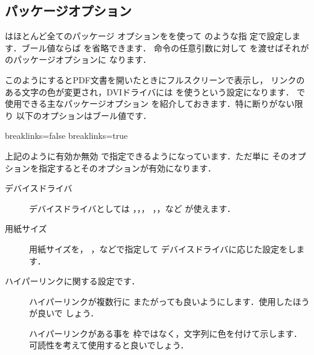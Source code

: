 \subsection{パッケージオプション}
はほとんど全てのパッケージ
オプションをを使って
のような指
定で設定します．ブール値ならば
を省略できます．
命令の任意引数に対して
を渡せばそれがのパッケージオプションに
なります．

\begin{InTeX}
\usepackage[pdfpagemode=FullScreen,colorlinks=true,dvipdfm]{hyperref} 
\end{InTeX}

このようにするとPDF文書を開いたときにフルスクリーンで表示し，
リンクのある文字の色が変更され，DVIドライバには
を使うという設定になります．
で使用できる主なパッケージオプション
を紹介しておきます．特に断りがない限り
以下のオプションはブール値です．

\begin{InTeX}
breaklinks=false 
breaklinks=true 
\end{InTeX}

上記のように有効か無効
で指定できるようになっています．ただ単に
そのオプションを指定するとそのオプションが有効になります．
\begin{description}
 \item[デバイスドライバ] デバイスドライバとしては
，，，
，，など
が使えます．

 \item[用紙サイズ] 用紙サイズを，
，などで指定して
デバイスドライバに応じた設定をします．
\end{description}

ハイパーリンクに関する設定です．
\begin{description}
 \item[] ハイパーリンクが複数行に
またがっても良いようにします．使用したほうが良いで
しょう．
 \item[] ハイパーリンクがある事を
枠ではなく，文字列に色を付けて示します．
可読性を考えて使用すると良いでしょう．
\end{description} 

